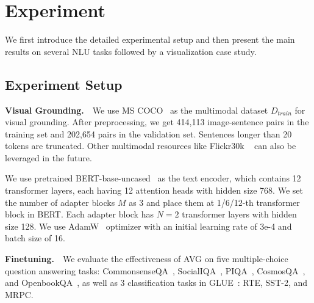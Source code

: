 \section{Experiment}
We first introduce the detailed experimental setup and then present the main results on several NLU tasks followed by a visualization case study.
\subsection{Experiment Setup}
\textbf{Visual Grounding.}~~We use MS COCO~\citep{mscoco} as the multimodal dataset $D_{train}$ for visual grounding. After preprocessing, we get 414,113 image-sentence pairs in the training set and 202,654 pairs in the validation set. Sentences longer than 20 tokens are truncated. Other multimodal resources like Flickr30k ~\citep{flickr} can also be leveraged in the future.

We use pretrained BERT-base-uncased~\citep{devlin-etal-2019-bert} as the text encoder, which contains 12 transformer layers, each having 12 attention heads with hidden size 768. We set the number of adapter blocks $M$ as 3 and place them at 1/6/12-th transformer block in BERT. Each adapter block has $N=2$ transformer layers with hidden size 128. We use AdamW~\citep{adamw} optimizer with an initial learning rate of 3e-4 and batch size of 16.

\textbf{Finetuning.}~~We evaluate the effectiveness of AVG on five multiple-choice question answering tasks: CommonsenseQA~\citep{csqa}, SocialIQA~\citep{socialiqa}, PIQA~\citep{piqa}, CosmosQA~\citep{cosmosqa}, and OpenbookQA~\citep{openbookqa}, as well as 3 classification tasks in GLUE~\citep{glue}: RTE, SST-2, and MRPC.

